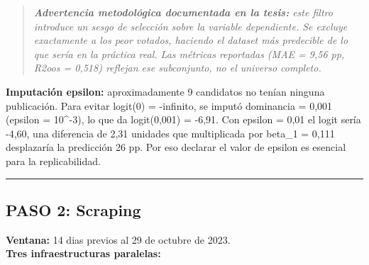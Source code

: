\documentclass[11pt,a4paper]{article}
\begin{document}
\begin{quote}\itshape \textbf{Advertencia metodológica documentada en la tesis:} este filtro introduce un sesgo de selección sobre la variable dependiente. Se excluye exactamente a los peor votados, haciendo el dataset más predecible de lo que sería en la práctica real. Las métricas reportadas (MAE = 9,56 pp, R2oos = 0,518) reflejan ese subconjunto, no el universo completo.\end{quote}

\textbf{Imputación epsilon:} aproximadamente 9 candidatos no tenían ninguna publicación. Para evitar logit(0) = -infinito, se imputó dominancia = 0,001 (epsilon = 10^-3), lo que da logit(0,001) = -6,91. Con epsilon = 0,01 el logit sería -4,60, una diferencia de 2,31 unidades que multiplicada por beta_1 = 0,111 desplazaría la predicción 26 pp. Por eso declarar el valor de epsilon es esencial para la replicabilidad.\\[2pt]

\vspace{4pt}\noindent\rule{\linewidth}{0.4pt}\vspace{4pt}

\subsection{PASO 2: Scraping}

\textbf{Ventana:} 14 dias previos al 29 de octubre de 2023.\\[2pt]

\textbf{Tres infraestructuras paralelas:}\\[2pt]
\end{document}
